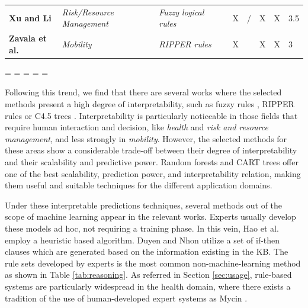\begin{table}[H]
\begin{tabular}{C{2.5cm}C{2cm}C{2cm}C{2cm}C{2cm}C{1.5cm}C{1.5cm}C{1.5cm}C{1.5cm}}
\textbf{Xu and Li} \citep{xuandli}           & \textit{Risk/Resource Management} & \textit{Fuzzy logical rules}                                         &                      & X                         & /                               & X                                 & X                        & 3.5                    \\ 
\textbf{Zavala et al.} \citep{zavalaetal}       & \textit{Mobility}                 & \textit{RIPPER rules} \citep{ripper}                                                &                      & X                         &                                 & X                                 & X                        & 3                      \\ \bottomrule

\end{tabular}

\end{table}

\newpage
\restoregeometry
\paperwidth=\pdfpageheight
\paperheight=\pdfpagewidth
\pdfpageheight=\paperheight
\pdfpagewidth=\paperwidth
\headwidth=\textwidth

 

Following this trend, we find that there are several works where the selected methods present a high degree of interpretability, such as fuzzy rules \citep{fuzzyenvironment}, RIPPER rules \citep{ripper} or C4.5 trees \citep{c45tree}. Interpretability is particularly noticeable in those fields that require human interaction and decision, like \textit{health} and \textit{risk and resource management}, and less strongly in \textit{mobility}. However, the selected methods for these areas show a considerable trade-off between their degree of interpretability and their scalability and predictive power. Random forests \citep{randomforest} and CART trees \citep{carttrees} offer one of the best scalability, prediction power, and interpretability relation, making them useful and suitable techniques for the different application domains.  

Under these interpretable predictions techniques, several methods out of the scope of machine learning appear in the relevant works. Experts usually develop these models ad hoc, not requiring a training phase. In this vein, Hao et al. \citep{haoetal} employ a heuristic based algorithm.  Duyen and Nhon \citep{duyenandnhon} utilize a set of if-then clauses which are generated based on the information existing in the KB. The rule sets developed by experts is the most common non-machine-learning method as shown in Table \ref{tab:reasoning}. As referred in Section \ref{sec:usage}, rule-based systems are particularly widespread in the health domain, where there exists a tradition of the use of human-developed expert systems as Mycin \citep{mycin}.

